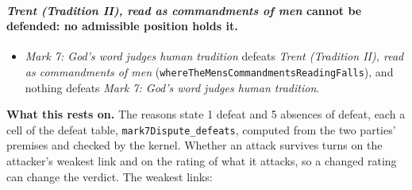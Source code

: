 \documentclass[11pt]{article}
\begin{document}
\paragraph{\emph{Trent (Tradition II), read as commandments of men} cannot be defended: no admissible position holds it.}
\begin{itemize}
\item \emph{Mark 7: God’s word judges human tradition} defeats \emph{Trent (Tradition II), read as commandments of men} (\texttt{where\allowbreak{}The\allowbreak{}Mens\allowbreak{}Commandments\allowbreak{}Reading\allowbreak{}Falls}), and nothing defeats \emph{Mark 7: God’s word judges human tradition}.
\end{itemize}
\par\noindent\textbf{What this rests on.} The reasons state 1 defeat and 5 absences of defeat, each a cell of the defeat table, \texttt{mark7\allowbreak{}Dispute\_\allowbreak{}defeats}, computed from the two parties' premises and checked by the kernel. Whether an attack survives turns on the attacker's weakest link and on the rating of what it attacks, so a changed rating can change the verdict. The weakest links:
\end{document}
